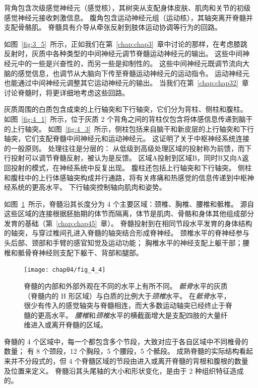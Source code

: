 背角包含次级感觉神经元（感觉核），其树突从支配身体皮肤、肌肉和关节的初级感觉神经元接收刺激信息。
腹角包含运动神经元组（运动核），其轴突离开脊髓并支配骨骼肌。
脊髓具有介导从牵张反射到肢体运动协调等行为的回路。


如图~\ref{fig:3_5}~所示，正如我们在第~\ref{chap:chap3}~章中讨论的那样，在考虑膝跳反射时，灰质中各种类型的中间神经元调节脊髓运动神经元的输出。 
这些中间神经元中的一些是兴奋性的，而另一些是抑制性的。
这些中间神经元既调节流向大脑的感觉信息，也调节从大脑向下传至脊髓运动神经元的运动指令。
运动神经元也能通过中间神经元调整其它运动神经元的输出。
当我们在第~\ref{chap:chap32}~章讨论脊髓时，将更详细地考虑这些回路。


灰质周围的白质包含成束的上行轴突和下行轴突，它们分为背柱、侧柱和腹柱。
如图~\ref{fig:4_1}~所示，位于灰质 2 个背角之间的背柱仅包含将体感信息传递到脑干的上行轴突。
如图~\ref{fig:4_3}~所示，侧柱包括来自脑干和新皮层的上行轴突和下行轴突，它们支配脊髓中间神经元和运动神经元。
这证明了关于中枢神经系统连接的一般原则。
处理往往是分层的：
从低级到高级处理区域的投射称为前馈，而下行投射可以调节脊髓反射，被认为是反馈。 
区域A投射到区域B，同时B又向A返回投射的模式，在神经系统中反复出现。
腹柱还包括上行轴突和下行轴突。
侧柱和腹柱中的上行体感轴突构成并行通路，将有关疼痛和热感觉的信息传递到中枢神经系统的更高水平。
下行轴突控制轴向肌肉和姿势。


如图~\ref{fig:4_4}~所示，脊髓沿其长度分为 4 个主要区域：颈椎、胸椎、腰椎和骶椎。
源自这些区域的连接根据胚胎期的体节而隔离，体节是肌肉、骨骼和身体其他组成部分发育的基础（第~\ref{chap:chap45}~章）。
脊髓投射到在相同节段水平发育的身体结构的轴突，与穿过椎间孔进入脊髓的轴突结合形成脊神经。
颈椎水平的脊神经参与头后部、颈部和手臂的感官知觉及运动功能；
胸椎水平的神经支配上躯干部；腰椎和骶骨脊神经则支配下躯干、背部和腿部。


\begin{figure}[htbp]
	\centering
	\texttt{[image: chap04/fig\_4\_4]}
	\caption{脊髓的内部和外部外观在不同的水平上有所不同。
		\textit{骶骨}水平的灰质（脊髓内的 H 形区域）与白质的比例大于\textit{颈椎}水平。
		在\textit{骶骨}水平，很少有传入的感觉轴突与脊髓相连，而大多数运动轴突已经终止于脊髓的更高水平。
		\textit{腰椎}和\textit{颈椎}水平的横截面增大是支配四肢的大量纤维进入或离开脊髓的区域。}
	\label{fig:4_4}
\end{figure}


脊髓的 4 个区域中，每一个都包含多个节段，大致对应于各自区域中不同椎骨的数量；
有 8 个颈段，12 个胸段，5 个腰段，5 个骶段。
成熟脊髓的实际结构看起来并不分段式的，但 4 个脊髓区域的节段由进入或离开脊髓的背根和腹根的数量及位置来定义。
脊髓沿其头尾轴的大小和形状变化，是由于 2 种组织特征造成的。


